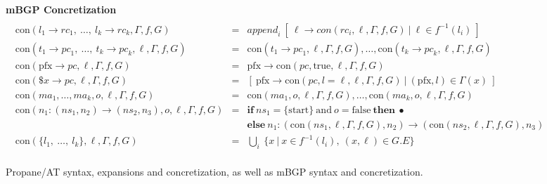 \documentclass[twocolumn, openany]{sig-alternate-10pt}
\newcommand{\sysname}{{\small \sf Propane/AT}\xspace}
\newcommand{\Con}{\mathrm{con}}
\newcommand{\Pfx}{\mathrm{pfx}}%
\newcommand{\hdr}[2]{\flushleft \chdr{\hspace{5mm}#1}{#2}}
\newcommand{\chdr}[2]{\textbf{#1} {#2} \\ \centering}%
\begin{document}
\begin{figure*}[h!]
  \begin{minipage}[t]{\linewidth}
  \hdr{mBGP Concretization}{}
  \vspace*{-2\baselineskip}
  \[ \begin{array}{lcl}
     \\
     \Con(l_1 \rightarrow {rc}_1, ~\dots,~ l_k \rightarrow {rc}_k,\Gamma,f,G)
        & = &
        \mathit{append}_i~ [~ \ell \rightarrow con(rc_i,\ell,\Gamma,f,G)  ~\vert~ \ell \in f^{-1}(l_i) ~]
        \\
     \Con(t_1 \rightarrow {pc}_1, ~\dots,~ t_k \rightarrow {pc}_k,\ell,\Gamma,f,G)
        & = &
        \Con(t_1 \rightarrow {pc}_1,\ell,\Gamma,f,G), \dots, \Con(t_k \rightarrow {pc}_k,\ell,\Gamma,f,G)
        \\
     \Con(\Pfx \rightarrow {pc},\ell,\Gamma,f,G)
        & = &
        \Pfx \rightarrow \Con(pc,\text{true},\ell,\Gamma,f,G)
        \\
     \Con(\$x \rightarrow {pc},\ell,\Gamma,f,G)
        & = &
        [~ \Pfx \rightarrow \Con(pc, l=\ell, \ell,\Gamma,f,G) ~\vert~ (\Pfx, l) \in \Gamma(x) ~]
        \\
     \Con(ma_1, \dots, ma_k,o,\ell,\Gamma,f,G)
        & = &
        \Con(ma_1,o,\ell,\Gamma,f,G), \dots, \Con(ma_k,o,\ell,\Gamma,f,G)
        \\%
     \Con(n_1 : ({ns}_1, n_2) \rightarrow ({ns}_2, n_3),o,\ell,\Gamma,f,G)
        & = & \textbf{if}~ ns_1 = \{\text{start}\} ~\text{and}~ o = \text{false} ~\textbf{then}~ \bullet \\
        &   & \textbf{else}~ n_1 : ( \Con({ns}_1,\ell,\Gamma,f,G), n_2) \rightarrow (\Con({ns}_2,\ell,\Gamma,f,G),n_3)%

        \\
     \Con(\{ l_1, ~\dots,~ l_k \}, \ell, \Gamma,f,G)
        & = &
        \bigcup_i ~ \{ x ~\vert~ x \in f^{-1}(l_i),~ (x,\ell) \in G.E \}
        \\
  \end{array} \]%
  \end{minipage}%

  \vspace{1em}
  \hrulefill%
  \vspace{1em}%

  \caption{\sysname syntax, expansions and concretization, as well as mBGP syntax and concretization.}
  \label{fig:syntax}
\end{figure*}%

\newpage
\end{document}
